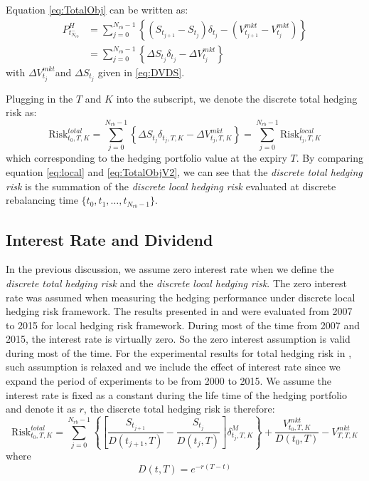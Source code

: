\documentclass[letterpaper,12pt,titlepage,oneside,final]{book}
\numberwithin{equation}{section}
\theoremstyle{definition}
\newcommand{\DS}{\Delta S}
\newcommand{\Vmkt}{V^{mkt}}
\newcommand{\Smkt}{S}
\begin{document}
Equation \eqref{eq:TotalObj} can be written as:
\[
\begin{split}
P^H_{t_{N_{rb}}^-}&=\sum_{j=0}^{N_{rb}-1}\left\{ \left( S_{t_{j+1}}-S_{t_{j}}\right) \delta_{t_j} -(V_{t_{j+1}}^{mkt}-V_{t_j}^{mkt}) \right\}\\
&=\sum_{j=0}^{N_{rb}-1}\left\{ \DS_{t_j} \delta_{t_j} -\Delta V^{mkt}_{t_j} \right\}
\end{split}
\]
with $\Delta V^{mkt}_{t_j}$and  $\DS_{t_j}$ given in \eqref{eq:DVDS}.


Plugging in the $T$ and $K$ into the subscript, we denote the discrete total hedging risk as:
\begin{equation}
    \text{Risk}^{total}_{t_0,T,K}=\sum_{j=0}^{N_{rb}-1}\left\{ \Delta \Smkt_{t_j} \delta_{t_j,T,K} -\Delta \Vmkt_{t_j,T,K} \right\}=\sum_{j=0}^{N_{rb}-1}\text{Risk}^{local}_{t_j,T,K}
    \label{eq:TotalObjV2}
    \end{equation}
which corresponding to the hedging portfolio value at the expiry $T$. 
By comparing equation \eqref{eq:local} and \eqref{eq:TotalObjV2}, we can see that the {\em discrete total hedging risk} is the summation of the {\em discrete local hedging risk} evaluated at discrete rebalancing time $\{t_0,t_1,\dots,t_{N_{rb}-1}\}$. 
\subsection{Interest Rate and Dividend}
In the previous discussion, we assume zero interest rate  when we define the {\em discrete total hedging risk} and the {\em discrete local hedging risk}. The zero interest rate  was assumed when measuring the hedging performance under discrete local hedging risk framework. The results presented in \cite{knian2017} and \cite{knian2019} were evaluated from 2007 to 2015 for local hedging risk framework. During  most of the time from 2007 and 2015, the interest rate is virtually zero. So the zero interest assumption is valid during most of the time.  For the experimental results for total hedging risk in \cite{knian2020}, such assumption is relaxed and we include the effect of interest rate since we expand the period of experiments to be from 2000 to 2015. We assume the interest rate is fixed as a constant during the life time of the hedging portfolio and denote it as $r$, the discrete total hedging risk is therefore:
\begin{equation}
	\text{Risk}^{total}_{t_0,T,K}=\sum_{j=0}^{N_{rb}-1}\left\{ \left[\frac{\Smkt_{t_{j+1}}}{D(t_{j+1},T)}-\frac{\Smkt_{t_{j}}}{D(t_{j},T)}\right] \delta^M_{t_j,T,K} \right\}+\frac{\Vmkt_{t_0,T,K}}{D(t_{0},T)}-\Vmkt_{T,T,K}
 \label{eq:TotalObjV3}
\end{equation}
where
\[D(t,T)=e^{-r(T-t)}\]
\end{document}

